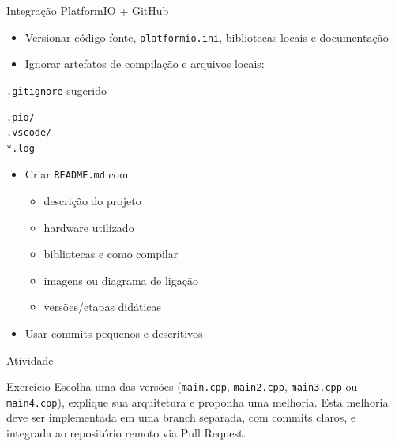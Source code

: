 \documentclass[aspectratio=169]{beamer}
\begin{document}
\begin{frame}[fragile]{Integração PlatformIO + GitHub}
    \begin{itemize}
        \item Versionar código-fonte, \texttt{platformio.ini}, bibliotecas locais e documentação
        \item Ignorar artefatos de compilação e arquivos locais:
    \end{itemize}
    \begin{block}{\texttt{.gitignore} sugerido}
        \begin{verbatim}
.pio/
.vscode/
*.log
        \end{verbatim}
    \end{block}
    \begin{itemize}
        \item Criar \texttt{README.md} com:
        \begin{itemize}
            \item descrição do projeto
            \item hardware utilizado
            \item bibliotecas e como compilar
            \item imagens ou diagrama de ligação
            \item versões/etapas didáticas
        \end{itemize}
        \item Usar commits pequenos e descritivos
    \end{itemize}
\end{frame}

\begin{frame}{Atividade}
    \begin{block}{Exercício}
        Escolha uma das versões (\texttt{main.cpp}, \texttt{main2.cpp}, \texttt{main3.cpp} ou \texttt{main4.cpp}), explique sua arquitetura e proponha uma melhoria.
        Esta melhoria deve ser implementada em uma branch separada, com commits claros, e integrada ao repositório remoto via Pull Request.
    \end{block}
\end{frame}
\end{document}
